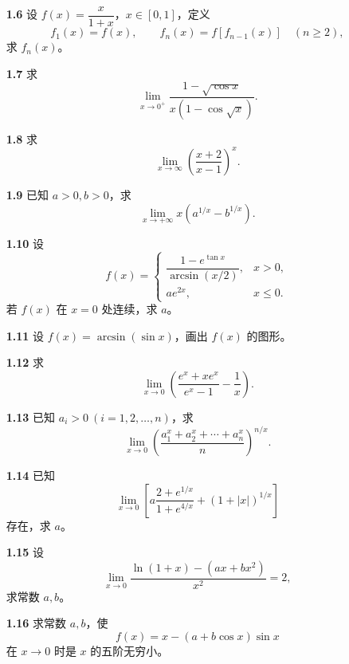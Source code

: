 \begin{problemBox}
\begin{enumerate}
  \item[\textbf{1.6}] 设 \(f(x)=\dfrac{x}{1+x}\)，\(x\in[0,1]\)，定义
  \[
    f_1(x)=f(x),\qquad f_n(x)=f\!\left[f_{n-1}(x)\right]\quad(n\ge2),
  \]
  求 \(f_n(x)\)。

  \item[\textbf{1.7}] 求
  \[
    \lim_{x\to0^+}\frac{1-\sqrt{\cos x}}{x\left(1-\cos\sqrt{x}\right)}.
  \]

  \item[\textbf{1.8}] 求
  \[
    \lim_{x\to\infty}\left(\frac{x+2}{x-1}\right)^x.
  \]

  \item[\textbf{1.9}] 已知 \(a>0,b>0\)，求
  \[
    \lim_{x\to+\infty}x\left(a^{1/x}-b^{1/x}\right).
  \]

  \item[\textbf{1.10}] 设
  \[
    f(x)=
    \begin{cases}
      \dfrac{1-e^{\tan x}}{\arcsin(x/2)},&x>0,\\[6pt]
      ae^{2x},&x\le0.
    \end{cases}
  \]
  若 \(f(x)\) 在 \(x=0\) 处连续，求 \(a\)。

  \item[\textbf{1.11}] 设 \(f(x)=\arcsin(\sin x)\)，画出 \(f(x)\) 的图形。

  \item[\textbf{1.12}] 求
  \[
    \lim_{x\to0}\left(\frac{e^x+xe^x}{e^x-1}-\frac1x\right).
  \]

  \item[\textbf{1.13}] 已知 \(a_i>0\ (i=1,2,\ldots,n)\)，求
  \[
    \lim_{x\to0}
    \left(\frac{a_1^x+a_2^x+\cdots+a_n^x}{n}\right)^{n/x}.
  \]

  \item[\textbf{1.14}] 已知
  \[
    \lim_{x\to0}\left[
      a\frac{2+e^{1/x}}{1+e^{4/x}}+(1+|x|)^{1/x}
    \right]
  \]
  存在，求 \(a\)。

  \item[\textbf{1.15}] 设
  \[
    \lim_{x\to0}\frac{\ln(1+x)-(ax+bx^2)}{x^2}=2,
  \]
  求常数 \(a,b\)。

  \item[\textbf{1.16}] 求常数 \(a,b\)，使
  \[
    f(x)=x-(a+b\cos x)\sin x
  \]
  在 \(x\to0\) 时是 \(x\) 的五阶无穷小。
\end{enumerate}
\end{problemBox}
